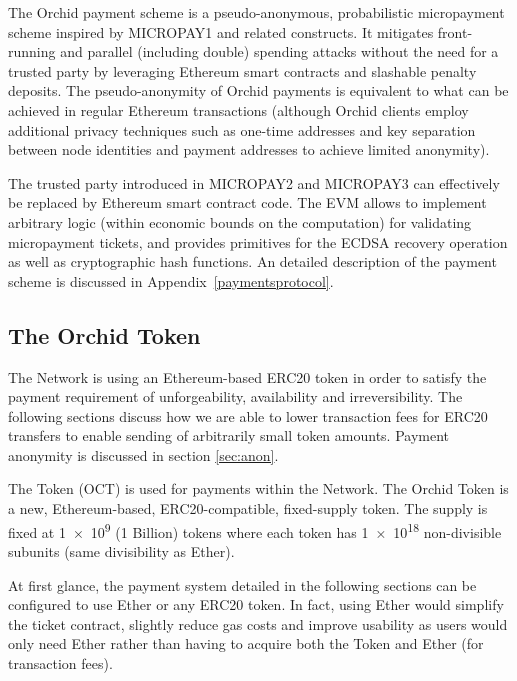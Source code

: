 The Orchid payment scheme is a pseudo-anonymous, probabilistic micropayment scheme inspired by MICROPAY1 and related constructs. It mitigates front-running and parallel (including double) spending attacks without the need for a trusted party by leveraging Ethereum smart contracts and slashable penalty deposits. The pseudo-anonymity of Orchid payments is equivalent to what can be achieved in regular Ethereum transactions (although Orchid clients employ additional privacy techniques such as one-time addresses and key separation between node identities and payment addresses to achieve limited anonymity).

The trusted party introduced in MICROPAY2 and MICROPAY3 can effectively be replaced by Ethereum smart contract code. The EVM allows to implement arbitrary logic (within economic bounds on the computation) for validating micropayment tickets, and provides primitives\cite{ETHSpec} for the ECDSA\cite{ECDSA} recovery operation as well as cryptographic hash functions. An detailed description of the payment scheme is discussed in Appendix~\ref{paymentsprotocol}.

\subsection{The Orchid Token}
\label{sec:oct}

The \Orchid{} Network is using an Ethereum-based ERC20 token in order to satisfy the payment requirement of unforgeability, availability and irreversibility. The following sections discuss how we are able to lower transaction fees for ERC20 transfers to enable sending of arbitrarily small token amounts. Payment anonymity is discussed in section \ref{sec:anon}.

The \Orchid{} Token (OCT) is used for payments within the \Orchid{} Network. The Orchid Token is a new, Ethereum-based, ERC20-compatible, fixed-supply token. The supply is fixed at \num{1e9} (1 Billion) tokens where each token has \num{1e18} non-divisible subunits (same divisibility as Ether).

At first glance, the \Orchid{} payment system detailed in the following sections can be configured to use Ether or any ERC20 token. In fact, using Ether would simplify the ticket contract, slightly reduce gas costs and improve usability as users would only need Ether rather than having to acquire both the \Orchid{} Token and Ether (for transaction fees).

